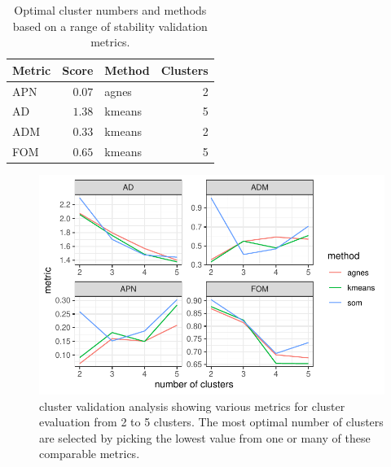 \documentclass[
  authoryear,
  preprint,
  3p]{elsarticle}
\begin{document}
\hypertarget{tbl-opticlust}{}
\begin{longtable}{lrlr}
\caption{\label{tbl-opticlust}Optimal cluster numbers and methods based on a range of stability
validation metrics. }\tabularnewline

\toprule
Metric & Score & Method & Clusters \\ 
\midrule
APN & $0.07$ & agnes & 2 \\ 
AD & $1.38$ & kmeans & 5 \\ 
ADM & $0.33$ & kmeans & 2 \\ 
FOM & $0.65$ & kmeans & 5 \\ 
\bottomrule
\end{longtable}

\begin{figure}

{\centering \includegraphics{paper_files/figure-pdf/fig-clvalid-1.pdf}

}

\caption{\label{fig-clvalid}cluster validation analysis showing various
metrics for cluster evaluation from 2 to 5 clusters. The most optimal
number of clusters are selected by picking the lowest value from one or
many of these comparable metrics.}

\end{figure}
\end{document}
